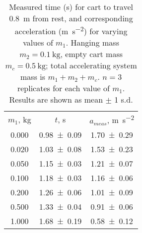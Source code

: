 \begin{table}
\begin{center}
\begin{ruledtabular}
\begin{tabular}{ccc}
$m_1$, \unit{\kilo\gram} & $t$, \unit{\second} & $a_{meas}$, \unit{\meter\per\second\squared} \\ 
\colrule
\num{0.000} & \num{0.98\pm0.09} & \num{1.70\pm0.29} \\ 
\num{0.020} & \num{1.03\pm0.08} & \num{1.53\pm0.23} \\ 
\num{0.050} & \num{1.15\pm0.03} & \num{1.21\pm0.07} \\ 
\num{0.100} & \num{1.18\pm0.03} & \num{1.16\pm0.06} \\ 
\num{0.200} & \num{1.26\pm0.06} & \num{1.01\pm0.09} \\ 
\num{0.500} & \num{1.33\pm0.04} & \num{0.91\pm0.06} \\ 
\num{1.000} & \num{1.68\pm0.19} & \num{0.58\pm0.12} \\ 
\end{tabular}
\end{ruledtabular}
\end{center}
\caption{\label{tab:newtable1} Measured time (\unit{\second}) for cart to travel \qty{0.8}{\meter} from rest, and corresponding acceleration (\unit{\meter\per\second\squared}) for varying values of $m_1$. Hanging mass $m_2=\qty{0.1}{\kilo\gram}$, empty cart mass $m_c=\qty{0.5}{\kilo\gram}$; total accelerating system mass is $m_1+m_2+m_c$. $n=3$ replicates for each value of $m_1$. Results are shown as mean $\pm$ 1 s.d.}
\end{table}
